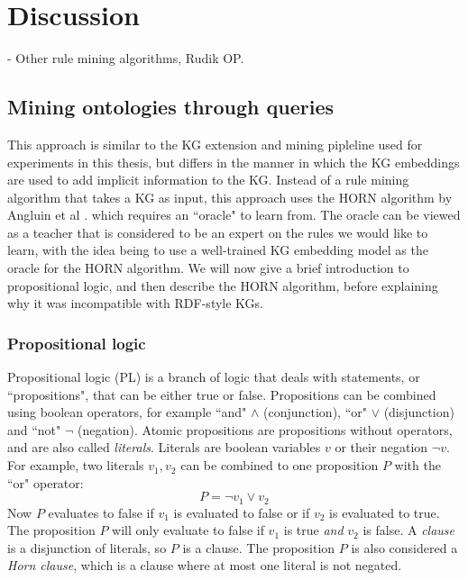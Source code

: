 \chapter{Discussion}
- Other rule mining algorithms, Rudik OP.



\section{Mining ontologies through queries}
This approach is similar to the KG extension and mining pipleline used for experiments in this thesis, but differs in the manner in which the KG embeddings are used to add implicit information to the KG. Instead of a rule mining algorithm that takes a KG as input, this approach uses the HORN algorithm by Angluin et al \cite{DBLP:journals/ml/AngluinFP92}. which requires an ``oracle" to learn from. The oracle can be viewed as a teacher that is considered to be an expert on the rules we would like to learn, with the idea being to use a well-trained KG embedding model as the oracle for the HORN algorithm. We will now give a brief introduction to propositional logic, and then describe the HORN algorithm, before explaining why it was incompatible with RDF-style KGs.

\subsection{Propositional logic}

Propositional logic (PL) is a branch of logic that deals with statements, or ``propositions", that can be either true or false. Propositions can be combined using boolean operators, for example ``and" $\wedge$ (conjunction), ``or" $\vee$ (disjunction) and ``not" $\neg$ (negation). Atomic propositions are propositions without operators, and are also called \textit{literals}. Literals are boolean variables $v$ or their negation $\neg v$. For example, two literals $v_1, v_2$ can be combined to one proposition $P$ with the ``or" operator:
\[P = \neg v_1 \vee v_2\]
Now $P$ evaluates to false if $v_1$ is evaluated to false or if $v_2$ is evaluated to true. The proposition $P$ will only evaluate to false if $v_1$ is true \textit{and} $v_2$ is false. A \textit{clause} is a disjunction of literals, so $P$ is a clause. The proposition $P$ is also considered a \textit{Horn clause}, which is a clause where at most one literal is not negated. 


